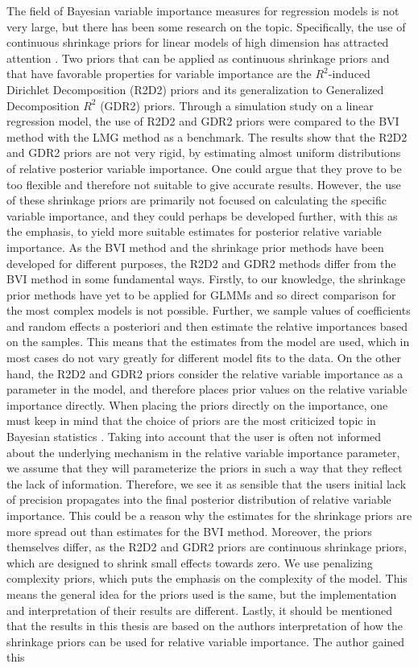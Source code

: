 The field of Bayesian variable importance measures for regression models is not very large, but there has been some research on the topic. Specifically, the use of continuous shrinkage priors for linear models of high dimension has attracted attention \citep{aguilar2024generalized}. Two priors that can be applied as continuous shrinkage priors and that have favorable properties for variable importance are the $R^2$-induced Dirichlet Decomposition (R2D2) priors \citep{zhang2020bayesian} and its generalization to Generalized Decomposition $R^2$ (GDR2) priors. Through a simulation study on a linear regression model, the use of R2D2 and GDR2 priors were compared to the BVI method with the LMG method as a benchmark. The results show that the R2D2 and GDR2 priors are not very rigid, by estimating almost uniform distributions of relative posterior variable importance. One could argue that they prove to be too flexible and therefore not suitable to give accurate results. However, the use of these shrinkage priors are primarily not focused on calculating the specific variable importance, and they could perhaps be developed further, with this as the emphasis, to yield more suitable estimates for posterior relative variable importance. As the BVI method and the shrinkage prior methods have been developed for different purposes, the R2D2 and GDR2 methods differ from the BVI method in some fundamental ways. Firstly, to our knowledge, the shrinkage prior methods have yet to be applied for GLMMs and so direct comparison for the most complex models is not possible. Further, we sample values of coefficients and random effects a posteriori and then estimate the relative importances based on the samples. This means that the estimates from the model are used, which in most cases do not vary greatly for different model fits to the data. On the other hand, the R2D2 and GDR2 priors consider the relative variable importance as a parameter in the model, and therefore places prior values on the relative variable importance directly. When placing the priors directly on the importance, one must keep in mind that the choice of priors are the most criticized topic in Bayesian statistics \citep{robert2007bayesian}. Taking into account that the user is often not informed about the underlying mechanism in the relative variable importance parameter, we assume that they will parameterize the priors in such a way that they reflect the lack of information. Therefore, we see it as sensible that the users initial lack of precision propagates into the final posterior distribution of relative variable importance. This could be a reason why the estimates for the shrinkage priors are more spread out than estimates for the BVI method. Moreover, the priors themselves differ, as the R2D2 and GDR2 priors are continuous shrinkage priors, which are designed to shrink small effects towards zero. We use penalizing complexity priors, which puts the emphasis on the complexity of the model. This means the general idea for the priors used is the same, but the implementation and interpretation of their results are different. Lastly, it should be mentioned that the results in this thesis are based on the authors interpretation of how the shrinkage priors can be used for relative variable importance. The author gained this 